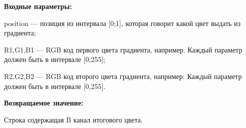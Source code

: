 \textbf{Входные параметры:}  

position --- позиция из интервала [0;1], которая говорит какой цвет выдать из градиента;
 
    R1,G1,B1 --- RGB код первого цвета градиента, например. Каждый параметр должен быть в интервале [0,255];
 
    R2,G2,B2 --- RGB код второго цвета градиента, например: Каждый параметр должен быть в интервале [0,255].

\textbf{Возвращаемое значение:}

Строка содержащая B канал итогового цвета.